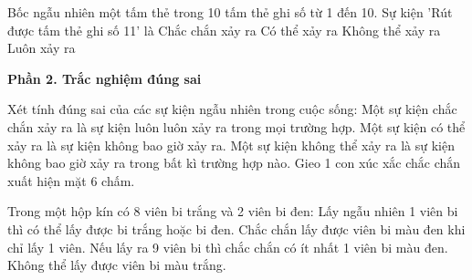 \begin{ex} %
Bốc ngẫu nhiên một tấm thẻ trong 10 tấm thẻ ghi số từ 1 đến 10. Sự kiện 'Rút được tấm thẻ ghi số 11' là
\choice
{Chắc chắn xảy ra}
{Có thể xảy ra}
{\True Không thể xảy ra}
{Luôn xảy ra}
\end{ex}

\textbf{Phần 2. Trắc nghiệm đúng sai}

\begin{ex} %
Xét tính đúng sai của các sự kiện ngẫu nhiên trong cuộc sống:
\choiceTF
{\True Một sự kiện chắc chắn xảy ra là sự kiện luôn luôn xảy ra trong mọi trường hợp.}
{Một sự kiện có thể xảy ra là sự kiện không bao giờ xảy ra.}
{\True Một sự kiện không thể xảy ra là sự kiện không bao giờ xảy ra trong bất kì trường hợp nào.}
{Gieo 1 con xúc xắc chắc chắn xuất hiện mặt 6 chấm.}
\end{ex}

\begin{ex} %
Trong một hộp kín có 8 viên bi trắng và 2 viên bi đen:
\choiceTF
{\True Lấy ngẫu nhiên 1 viên bi thì có thể lấy được bi trắng hoặc bi đen.}
{Chắc chắn lấy được viên bi màu đen khi chỉ lấy 1 viên.}
{\True Nếu lấy ra 9 viên bi thì chắc chắn có ít nhất 1 viên bi màu đen.}
{Không thể lấy được viên bi màu trắng.}
\end{ex}

